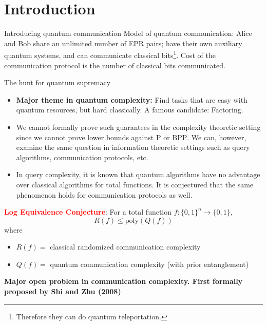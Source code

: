 	\section{Introduction}

\begin{frame}{Introducing quantum communication}
Model of quantum communication: Alice and Bob share an unlimited number of EPR pairs; have their own auxiliary quantum systems, and can communicate classical bits\footnote{Therefore they can do quantum teleportation.}. Cost of the communication protocol is the number of classical bits communicated. \newline



\end{frame}	



\begin{frame}{The hunt for quantum supremacy}
	
\begin{itemize}
\item<1->\textbf{Major theme in quantum complexity: }Find tasks that are easy with quantum resources, but hard classically. A famous candidate: Factoring.

\item<2-> We cannot formally prove such guarantees in the complexity theoretic setting since we cannot prove lower bounds against $\text{P}$ or $\text{BPP}$. We can, however, examine the same question in information theoretic settings such as query algorithms, communication protocols, etc. 

\item<3-> In query complexity, it is known that quantum algorithms have no advantage over classical algorithms for total functions. It is conjectured that the same phenomenon holds for communication protocols as well.
\end{itemize}

	
\end{frame}	




\begin{frame}
	\textcolor{red}{\textbf{Log Equivalence Conjecture}}: For a total function $f: \{0,1\}^n  \rightarrow \{0,1\}$, 
	$$R(f) \leq \text{poly}(Q(f))$$
	where
	\begin{itemize}
		\item $R(f)=$ classical randomized communication complexity
		\item $Q(f)=$ quantum communication complexity (with prior entanglement)
	\end{itemize}
	
	\textbf{Major open problem in communication complexity. First formally proposed by Shi and Zhu (2008)}
	
	
	
\end{frame}

